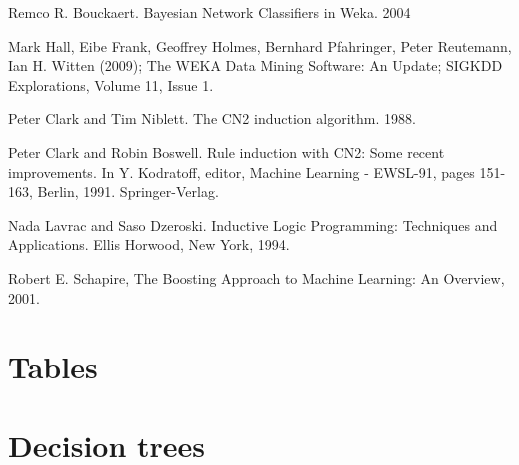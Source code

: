 \documentclass[a4paper]{llncs}
\begin{document}
\begin{thebibliography}{1}
Remco R. Bouckaert. Bayesian Network Classifiers in Weka. 2004

Mark Hall, Eibe Frank, Geoffrey Holmes, Bernhard Pfahringer, Peter Reutemann, Ian H. Witten (2009); The WEKA Data Mining Software: An Update; SIGKDD Explorations, Volume 11, Issue 1.

Peter Clark and Tim Niblett. The CN2 induction algorithm. 1988.

Peter Clark and Robin Boswell. Rule induction with CN2: Some recent improvements. In Y. Kodratoff, editor, Machine Learning - EWSL-91, pages 151-163, Berlin, 1991. Springer-Verlag.

Nada Lavrac and Saso Dzeroski. Inductive Logic Programming: Techniques and Applications. Ellis Horwood, New York, 1994.

Robert E. Schapire, The Boosting Approach to Machine Learning: An Overview, 2001.

\end{thebibliography}

\clearpage

\appendix

\section{Tables}

\clearpage
\section{Decision trees}
\end{document}
